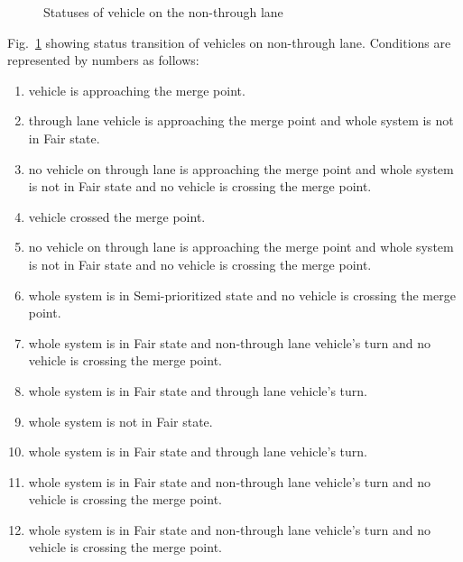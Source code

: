 \documentclass[10pt, conference, compsocconf]{IEEEtran}
\begin{document}
\begin{figure}[h]
\begin{center}
\end{center}
\caption{Statuses of vehicle on the non-through lane}
\label{nonThroughLaneStatus}
\end{figure}

Fig.~\ref{nonThroughLaneStatus} showing status transition of vehicles on non-through lane.
Conditions are represented by numbers as follows:
\begin{enumerate}
    \item vehicle is approaching the merge point. %
    \item through lane vehicle is approaching the merge point and whole system is not in Fair state. %
    \item no vehicle on through lane is approaching the merge point and whole system is not in Fair state and no vehicle is crossing the merge point. %
    \item vehicle crossed the merge point. %
    \item no vehicle on through lane is approaching the merge point and whole system is not in Fair state and no vehicle is crossing the merge point. %
    \item whole system is in Semi-prioritized state and no vehicle is crossing the merge point. %
    \item whole system is in Fair state and non-through lane vehicle's turn and no vehicle is crossing the merge point. %
    \item whole system is in Fair state and through lane vehicle's turn. %
    \item whole system is not in Fair state. %
    \item whole system is in Fair state and through lane vehicle's turn. %
    \item whole system is in Fair state and non-through lane vehicle's turn and no vehicle is crossing the merge point. %
    \item whole system is in Fair state and non-through lane vehicle's turn and no vehicle is crossing the merge point. %
\end{enumerate}
\end{document}

